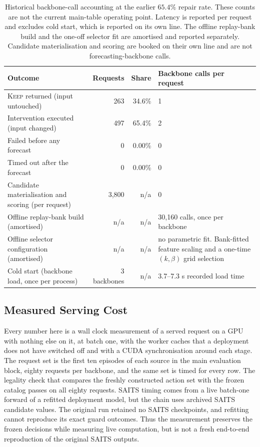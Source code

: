 \documentclass{article}
\begin{document}
\begin{table}[htbp]
  \caption{Historical backbone-call accounting at the earlier $65.4\%$ repair rate.
  These counts are not the current main-table operating point. Latency is reported per request and excludes cold start,
  which is reported on its own line. The offline replay-bank build and the one-off selector fit
  are amortised and reported separately. Candidate materialisation and scoring are booked on
  their own line and are not forecasting-backbone calls.}
  \label{tab:app-calls}
  \centering
  \small
  \setlength{\tabcolsep}{4pt}
\begin{tabularx}{\textwidth}{@{}XrrX@{}}
    \toprule
    Outcome & Requests & Share & Backbone calls per request \\
    \midrule
    \textsc{Keep} returned (input untouched)   & 263    & 34.6\%    & 1 \\
    Intervention executed (input changed)      & 497     & 65.4\%     & 2 \\
    Failed before any forecast                 & 0    & 0.00\%    & 0 \\
    Timed out after the forecast               & 0 & 0.00\% & 0 \\
    \midrule
    Candidate materialisation and scoring (per request) & 3,800 & n/a & 0 \\
    Offline replay-bank build (amortised)      & n/a & n/a & 30,160 calls, once per backbone \\
    Offline selector configuration (amortised)  & n/a & n/a & no parametric fit. Bank-fitted feature scaling and a one-time $(k,\beta)$ grid selection \\
    Cold start (backbone load, once per process) & 3 backbones & n/a & 3.7--7.3 s recorded load time \\
    \bottomrule
  \end{tabularx}
\end{table}

\subsection{Measured Serving Cost}
\label{app:calls-measured}
Every number here is a wall clock measurement of a served request on a GPU with nothing else
on it, at batch one, with the worker caches that a deployment does not have switched off and
with a CUDA synchronisation around each stage. The request set is the first ten episodes of
each source in the main evaluation block, eighty requests per backbone, and the same set is
timed for every row. The legality check that compares the freshly constructed action set with
the frozen catalog passes on all eighty requests. SAITS timing comes from a live batch-one
forward of a refitted deployment model, but the chain uses archived SAITS candidate values.
The original run retained no SAITS checkpoints, and refitting cannot reproduce its exact
guard outcomes. Thus the measurement preserves the frozen decisions while measuring live
computation, but is not a fresh end-to-end reproduction of the original SAITS outputs.
\end{document}
